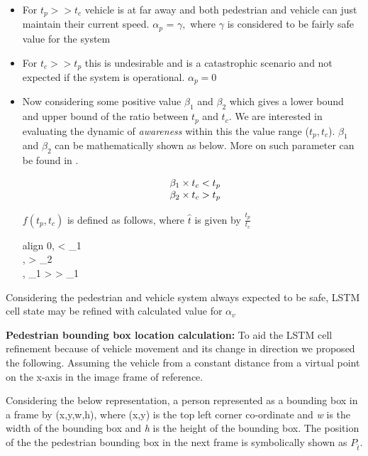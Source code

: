 \begin{itemize}
\item 
For ${t_p}>>{t_c}$ vehicle is at far away and both pedestrian and vehicle can just maintain their current speed. $\alpha_p$ = $\gamma,$ where $\gamma$ is considered to be fairly safe value for the system

\item 
For ${t_c}>>{t_p}$ this is undesirable and is a catastrophic scenario and not expected if the system is operational. $\alpha_p = 0$

\item
	Now considering some positive value $\beta_1$ and $\beta_2$ which gives a lower bound and upper bound of the ratio between $t_p$ and $t_c$. We are interested in evaluating the dynamic of \textit{awareness} within this the value range ($t_p, t_c$). $\beta_1$ and $\beta_2$ can be mathematically shown as below. More on such parameter can be found in \cite{yousef2016forward}.

	\begin{equation}
	\begin{array}{l@{}}
		\beta_1 \times {t_c} < {t_p} \\
		\beta_2 \times {t_c} > {t_p}
	\end{array}
	\end{equation}

	$f(t_p, t_c)$ is defined as follows, where $\hat{t}$ is given by $\frac{t_p}{t_c}$\\
	\begin{empheq}[left=\empheqlbrace]{align}
		0,  < \beta_1 \\
		\gamma,  > \beta_2 \\
		\gamma \times {}, \beta_1 >  > \beta_1
	\end{empheq}

\end {itemize}

Considering the pedestrian and vehicle system always expected to be safe, LSTM cell state may be refined with calculated value for $\alpha_v$

\newpara
\textbf{Pedestrian bounding box location calculation:}
To aid the LSTM cell refinement because of vehicle movement and its change in direction we proposed the following. Assuming the vehicle from a constant distance from a virtual point on the x-axis in the image frame of reference.

Considering the below representation, a person represented as a bounding box in a frame by (x,y,w,h), where (x,y) is the top left corner co-ordinate and \textit{w} is the width of the bounding box and \textit{h} is the height of the bounding box. The position of the the pedestrian bounding box in the next frame is symbolically shown as ${P}_{\hat{t}}$.

